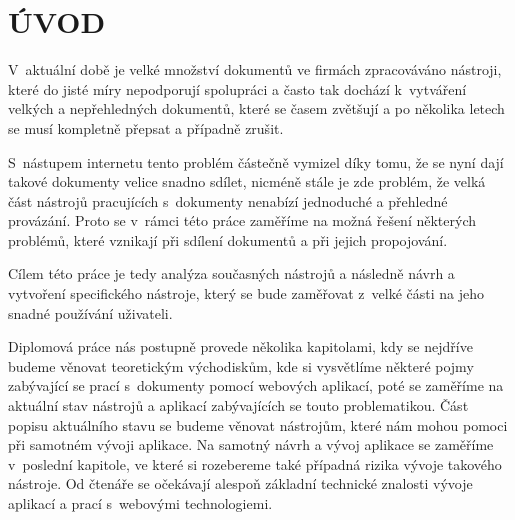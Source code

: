 \chapter*{ÚVOD}
\par V~aktuální době je velké množství dokumentů ve firmách zpracováváno nástroji, které do jisté míry nepodporují spolupráci a často tak dochází k~vytváření velkých a nepřehledných dokumentů, které se časem zvětšují a po několika letech se musí kompletně přepsat a případně zrušit.

\par S~nástupem internetu tento problém částečně vymizel díky tomu, že se nyní dají takové dokumenty velice snadno sdílet, nicméně stále je zde problém, že velká část nástrojů pracujících s~dokumenty nenabízí jednoduché a přehledné provázání. Proto se v~rámci této práce zaměříme na možná řešení některých problémů, které vznikají při sdílení dokumentů a při jejich propojování.

\par Cílem této práce je tedy analýza současných nástrojů a následně návrh a vytvoření specifického nástroje, který se bude zaměřovat z~velké části na jeho snadné používání uživateli.

\par Diplomová práce nás postupně provede několika kapitolami, kdy se nejdříve budeme věnovat teoretickým východiskům, kde si vysvětlíme některé pojmy zabývající se prací s~dokumenty pomocí webových aplikací, poté se zaměříme na aktuální stav nástrojů a aplikací zabývajících se touto problematikou. Část popisu aktuálního stavu se budeme věnovat nástrojům, které nám mohou pomoci při samotném vývoji aplikace. Na samotný návrh a vývoj aplikace se zaměříme v~poslední kapitole, ve které si rozebereme také případná rizika vývoje takového nástroje. Od čtenáře se očekávají alespoň základní technické znalosti vývoje aplikací a prací s~webovými technologiemi.


